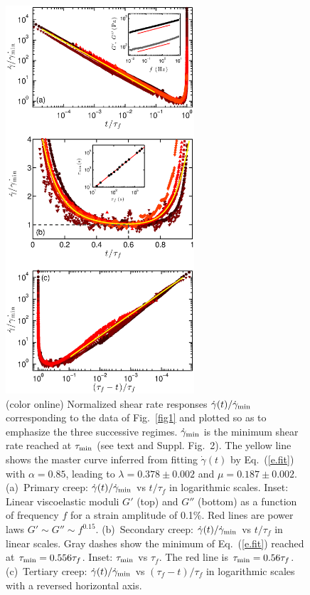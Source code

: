 \documentclass[twocolumn,superscriptaddress,showpacs,preprintnumbers,amsmath,amssymb,prl]{revtex4}
\newcommand\gp{\dot\gamma}
\newcommand\gpm{\dot\gamma_{\rm min}}
\newcommand\taum{\tau_{\rm min}}
\begin{document}
\begin{figure}
\centering
\includegraphics[width=7cm,clip]{Fig2.eps}
\caption{(color online) Normalized shear rate responses $\gp(t)/\gpm$ corresponding to the data of Fig.~\ref{fig1} and plotted so as to emphasize the three successive regimes. $\gpm$ is the minimum shear rate reached at $\taum$ (see text and Suppl. Fig.~2). The yellow line shows the master curve inferred from fitting $\gp(t)$ by Eq.~(\ref{e.fit}) with $\alpha=0.85$, leading to $\lambda=0.378\pm 0.002$ and $\mu=0.187\pm 0.002$. (a)~Primary creep: $\gp(t)/\gpm$ vs $t/\tau_f$ in logarithmic scales. Inset: Linear viscoelastic moduli $G'$ (top) and $G''$ (bottom) as a function of frequency $f$ for a strain amplitude of 0.1\%. Red lines are power laws $G'\sim G''\sim f^{0.15}$. (b)~Secondary creep: $\gp(t)/\gpm$ vs $t/\tau_f$ in linear scales. Gray dashes show the minimum of Eq.~(\ref{e.fit}) reached at $\taum=0.556\tau_f$. Inset: $\taum$ vs $\tau_f$. The red line is $\taum=0.56\tau_f$. (c)~Tertiary creep: $\gp(t)/\gpm$ vs $(\tau_f-t)/\tau_f$ in logarithmic scales with a reversed horizontal axis.\label{fig2}}
\end{figure} 
\end{document}
